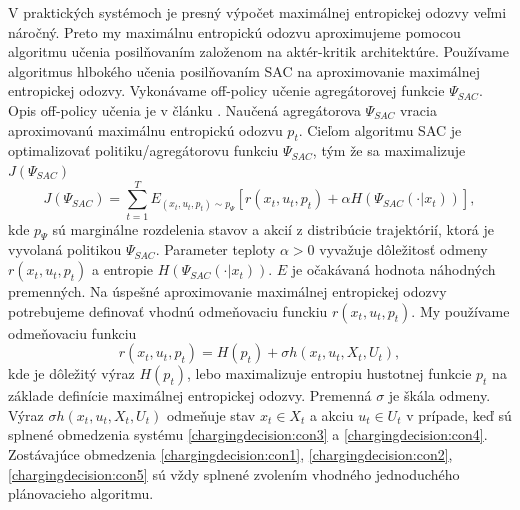 V praktických systémoch je presný výpočet maximálnej entropickej odozvy veľmi náročný. Preto my maximálnu entropickú odozvu aproximujeme pomocou algoritmu učenia posilňovaním založenom na aktér-kritik architektúre. Používame algoritmus hlbokého učenia posilňovaním SAC na aproximovanie maximálnej entropickej odozvy. Vykonávame off-policy učenie agregátorovej funkcie $\Psi_{SAC}$. Opis off-policy učenia je v článku \cite{haarnoja2018softactorcriticoffpolicymaximum}. Naučená agregátorova $\Psi_{SAC}$ vracia aproximovanú maximálnu entropickú odozvu $p_{t}$. Cieľom algoritmu SAC je optimalizovať politiku/agregátorovu funkciu $\Psi_{SAC}$, tým že sa maximalizuje $J(\Psi_{SAC})$
\begin{equation}
    J(\Psi_{SAC}) = \sum_{t=1}^{T} E_{(x_{t},u_{t},p_{t}) \sim p_{\Psi}}[r(x_{t}, u_{t}, p_{t}) + \alpha H(\Psi_{SAC}(\cdot | x_{t}))],
\end{equation}
kde $p_{\Psi}$ sú marginálne rozdelenia stavov a akcií z distribúcie trajektórií, ktorá je vyvolaná politikou $\Psi_{SAC}$. Parameter teploty $\alpha > 0$ vyvažuje dôležitosť odmeny $r(x_{t}, u_{t}, p_{t})$ a entropie $H(\Psi_{SAC}(\cdot | x_{t}))$. $E$ je očakávaná hodnota náhodných premenných.
Na úspešné aproximovanie maximálnej entropickej odozvy potrebujeme definovať vhodnú odmeňovaciu funckiu $r(x_{t}, u_{t}, p_{t})$. My používame odmeňovaciu funkciu 
\begin{equation}
    \label{reward:generic:function}
    r(x_{t}, u_{t}, p_{t}) = H(p_{t}) + \sigma h(x_{t}, u_{t}, X_{t}, U_{t}),
\end{equation}
kde je dôležitý výraz $H(p_{t})$, lebo maximalizuje entropiu hustotnej funkcie $p_{t}$ na základe definície maximálnej entropickej odozvy. Premenná $\sigma$ je škála odmeny. Výraz 
$\sigma h(x_{t}, u_{t}, X_{t}, U_{t})$ odmeňuje stav $x_{t} \in X_{t}$ a akciu $u_{t} \in U_{t}$ v prípade, keď sú splnené obmedzenia systému \eqref{chargingdecision:con3} a \eqref{chargingdecision:con4}. Zostávajúce obmedzenia  \eqref{chargingdecision:con1}, \eqref{chargingdecision:con2}, \eqref{chargingdecision:con5} sú vždy splnené zvolením vhodného jednoduchého plánovacieho algoritmu.

